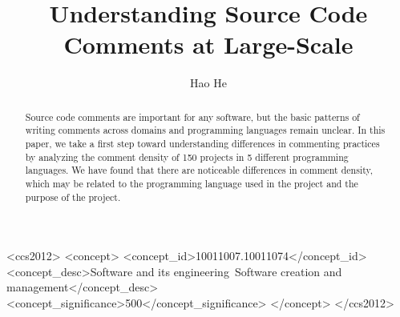 \documentclass[sigconf,screen]{acmart}
\begin{document}
\title{Understanding Source Code Comments at Large-Scale}


\author{Hao He}

\begin{abstract}
Source code comments are important for any software, but the basic patterns of writing comments across domains and programming languages remain unclear. In this paper, we take a first step toward understanding differences in commenting practices by analyzing the comment density of 150 projects in 5 different programming languages. We have found that there are noticeable differences in comment density, which may be related to the programming language used in the project and the purpose of the project.
\end{abstract}

\begin{CCSXML}
<ccs2012>
<concept>
<concept_id>10011007.10011074</concept_id>
<concept_desc>Software and its engineering~Software creation and management</concept_desc>
<concept_significance>500</concept_significance>
</concept>
</ccs2012>
\end{CCSXML}




\maketitle
\end{document}
